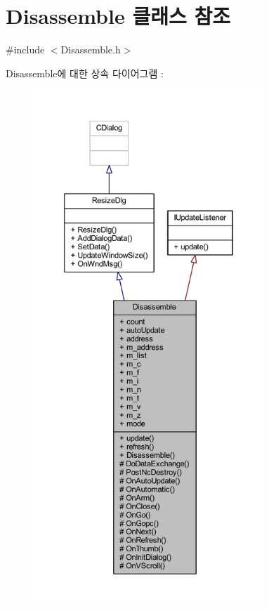 \hypertarget{class_disassemble}{}\section{Disassemble 클래스 참조}
\label{class_disassemble}


{\ttfamily \#include $<$Disassemble.\+h$>$}



Disassemble에 대한 상속 다이어그램 \+: \nopagebreak
\begin{figure}[H]
\begin{center}
\leavevmode
\includegraphics[height=550pt]{class_disassemble__inherit__graph}
\end{center}
\end{figure}


